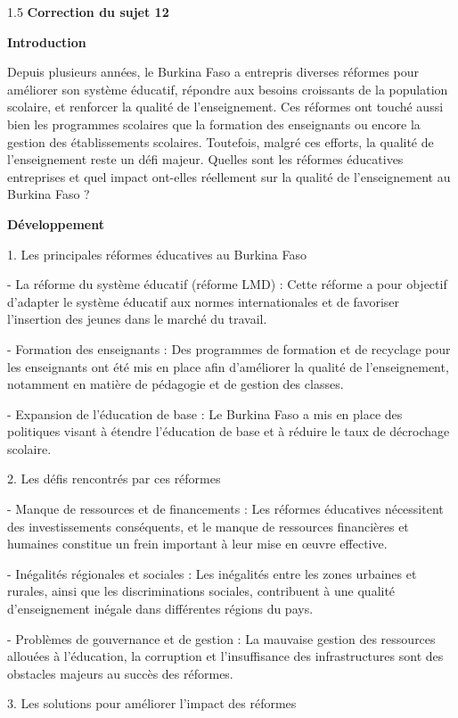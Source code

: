 \documentclass[12pt]{article}
\begin{document}
\begin{spacing}{1.5}
\textbf{Correction du sujet 12}

\textbf{Introduction  }


Depuis plusieurs années, le Burkina Faso a entrepris diverses réformes pour améliorer son système éducatif, répondre aux besoins croissants de la population scolaire, et renforcer la qualité de l'enseignement. Ces réformes ont touché aussi bien les programmes scolaires que la formation des enseignants ou encore la gestion des établissements scolaires. Toutefois, malgré ces efforts, la qualité de l'enseignement reste un défi majeur. Quelles sont les réformes éducatives entreprises et quel impact ont-elles réellement sur la qualité de l'enseignement au Burkina Faso ?

\textbf{Développement }

1. Les principales réformes éducatives au Burkina Faso  
   
   - La réforme du système éducatif (réforme LMD) : Cette réforme a pour objectif d'adapter le système éducatif aux normes internationales et de favoriser l'insertion des jeunes dans le marché du travail.  
   
   - Formation des enseignants : Des programmes de formation et de recyclage pour les enseignants ont été mis en place afin d'améliorer la qualité de l'enseignement, notamment en matière de pédagogie et de gestion des classes.
    
  - Expansion de l'éducation de base : Le Burkina Faso a mis en place des politiques visant à étendre l'éducation de base et à réduire le taux de décrochage scolaire.

2. Les défis rencontrés par ces réformes
  
   - Manque de ressources et de financements : Les réformes éducatives nécessitent des investissements conséquents, et le manque de ressources financières et humaines constitue un frein important à leur mise en œuvre effective. 
    
   - Inégalités régionales et sociales : Les inégalités entre les zones urbaines et rurales, ainsi que les discriminations sociales, contribuent à une qualité d'enseignement inégale dans différentes régions du pays.  
   
   - Problèmes de gouvernance et de gestion : La mauvaise gestion des ressources allouées à l'éducation, la corruption et l'insuffisance des infrastructures sont des obstacles majeurs au succès des réformes.

3. Les solutions pour améliorer l'impact des réformes


\end{spacing}
\end{document}
